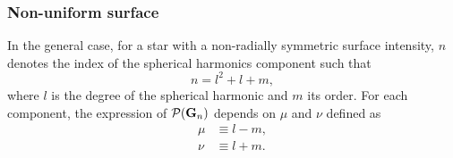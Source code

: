\documentclass[modern]{aastex631}
\begin{document}
\subsubsection{Non-uniform surface}
In the general case, for a star with a non-radially symmetric surface intensity, $n$ denotes the index of the spherical harmonics component such that
\begin{equation}
    n = l^2 + l + m,
\end{equation}
where $l$ is the degree of the spherical harmonic and $m$ its order. For each component, the expression of $\mathcal{P}({\mathbf{G}}_n)$ depends on $\mu$ and $\nu$ defined as
\begin{equation}
    \begin{aligned}
    \mu &\equiv l - m,\\
    \nu &\equiv l + m.
    \end{aligned}
\end{equation}
\end{document}
